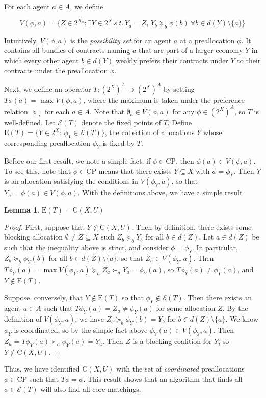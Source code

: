 \documentclass[11pt,reqno]{amsart}
\newtheorem{lemma}[thm]{Lemma}
\theoremstyle{definition}
\numberwithin{equation}{section}
\newcommand{\prf}{\begin{proof}}
\newcommand{\eprf}{\end{proof}}
\newcommand{\pre}{\phi}
\newcommand{\coordpre}{\mathrm{CP}}
\newcommand{\prealloc}{(2^X)^A}
\newcommand{\sub}{\subseteq}
\newcommand{\strcore}{\mathrm{C}(X,U)}
\newcommand{\fecon}{\mathrm{E}}
\newcommand{\fix}{\mathcal{E}}
\newcommand{\suq}{\succeq}
\newcommand{\su}{\succ}
\begin{document}
For each agent $a \in A$, we define 

\[
V(\pre, a) = \{Z \in 2^{X_a}: \exists Y \in 2^X \, s.t. \,  Y_a = Z, \, Y_b \suq_b \pre(b) \: \forall b \in d(Y)\setminus\{a\} \}
\]

Intuitively, $V(\pre, a)$ is the \emph{possibility set} for an agent $a$ at a preallocation $\pre$. 
It contains all bundles of contracts naming $a$ that are part of a larger economy $Y$ in which every other agent $b \in d(Y)$ weakly prefers their contracts under $Y$ to their contracts under the preallocation $\pre$.  

Next, we define an operator $T: \prealloc \to \prealloc$ by setting $T \pre(a) = \max V(\pre, a)$, where the maximum is taken under the preference relation $\suq_a$ for each $a \in A$.
Note that $\emptyset_a \in V(\pre,a)$ for any $\pre \in \prealloc$, so $T$ is well-defined. Let $\fix(T)$ denote the fixed points of $T$. Define $\fecon(T) = \{Y \in 2^X: \, \pre_Y \in \fix(T)\}$, the collection of allocations $Y$ whose corresponding preallocation $\pre_Y$ is fixed by $T$.

Before our first result, we note a simple fact: if $\pre \in \coordpre$, then $\pre(a) \in V(\pre, a)$.
To see this, note that $\pre \in \coordpre$ means that there exists $Y \sub X$ with $\pre = \pre_Y$. 
Then $Y$ is an allocation satisfying the conditions in $V(\pre_Y,a)$, so that $Y_a  = \pre(a) \in V(\pre,a)$. 
With the definitions above, we have a simple result
\begin{lemma} \label{lemma:strictcore}
$\fecon(T) = \strcore$
\end{lemma}
\prf
First, suppose that $Y \not \in \strcore$. Then by definition, there exists some blocking allocation $\emptyset \not = Z \sub X$ such $Z_b \suq_b Y_b$ for all $b \in d(Z)$.
Let $a \in d(Z)$ be such that the inequality above is strict, and consider $\pre = \pre_Y$. 
In particular, $Z_b \suq_b \pre_Y(b)$ for all $b \in d(Z) \setminus \{a\}$, so that $Z_a \in V(\pre_Y, a)$.
Then $T \pre_Y(a) = \max V(\pre_Y, a) \suq_a Z_a \su_a Y_a = \pre_Y(a)$, so $T\pre_Y(a) \not = \pre_Y(a)$, and $Y \not \in \fecon(T)$.  

Suppose, conversely, that $Y \not \in \fecon(T)$ so that $\pre_Y \not \in \fix(T)$.  
Then there exists an agent $a \in A$ such that $T\pre_Y(a) = Z_a \not = \pre_Y(a)$ for some allocation $Z$.  
By the definition of $V(\pre_Y,a)$, we have $Z_b \suq_b \pre_Y(b) = Y_b$ for $b \in d(Z) \setminus \{a\}$.
We know $\pre_Y$ is coordinated, so by the simple fact above $\pre_Y(a) \in V(\pre_Y,a)$.
Then $Z_a = T \pre_Y(a) \su_a \pre_Y(a) =  Y_a$. Then $Z$ is a blocking coalition for $Y$, so $Y \not \in \strcore$.  
\eprf
Thus, we have identified $\strcore$ with the set of \emph{coordinated} preallocations $\pre \in \coordpre$ such that $T \pre = \pre$. 
This result shows that an algorithm that finds all $\pre \in \fix(T)$ will also find all core matchings. 
\end{document}
